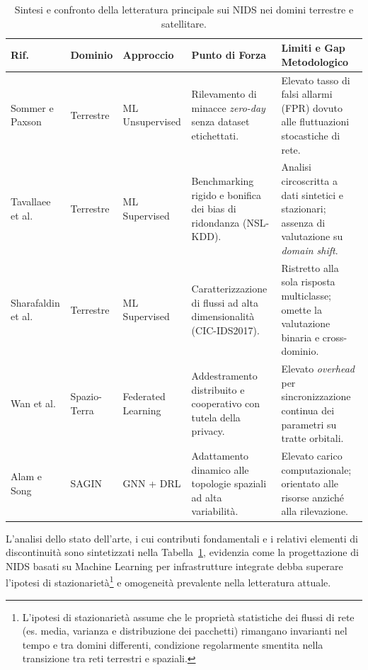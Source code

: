 \begin{table}[H]
\centering
\scriptsize
\renewcommand{\arraystretch}{1.1}
\setlength{\tabcolsep}{3pt}
\caption{Sintesi e confronto della letteratura principale sui NIDS nei domini terrestre e satellitare.}
\label{tab:stato_arte_nids}
\begin{tabularx}{\textwidth}{l l l >{\RaggedRight\arraybackslash}X >{\RaggedRight\arraybackslash}X}
\toprule
\textbf{Rif.} & \textbf{Dominio} & \textbf{Approccio} & \textbf{Punto di Forza} & \textbf{Limiti e Gap Metodologico} \\
\midrule
Sommer e Paxson \cite{sommer2010} & Terrestre & ML Unsupervised & Rilevamento di minacce \textit{zero-day} senza dataset etichettati. & Elevato tasso di falsi allarmi (FPR) dovuto alle fluttuazioni stocastiche di rete. \\ [2pt]
Tavallaee et al. \cite{tavallaee2009} & Terrestre & ML Supervised & Benchmarking rigido e bonifica dei bias di ridondanza (NSL-KDD). & Analisi circoscritta a dati sintetici e stazionari; assenza di valutazione su \textit{domain shift}. \\ [2pt]
Sharafaldin et al. \cite{sharafaldin2018} & Terrestre & ML Supervised & Caratterizzazione di flussi ad alta dimensionalità (CIC-IDS2017). & Ristretto alla sola risposta multiclasse; omette la valutazione binaria e cross-dominio. \\ [2pt]
Wan et al. \cite{wan2025} & Spazio-Terra & Federated Learning & Addestramento distribuito e cooperativo con tutela della privacy. & Elevato \textit{overhead} per sincronizzazione continua dei parametri su tratte orbitali. \\ [2pt]
Alam e Song \cite{alam2024} & SAGIN & GNN + DRL & Adattamento dinamico alle topologie spaziali ad alta variabilità. & Elevato carico computazionale; orientato alle risorse anziché alla rilevazione. \\
\bottomrule
\end{tabularx}
\end{table}

\vspace{0.5em}
\noindent
L'analisi dello stato dell'arte, i cui contributi fondamentali e i relativi elementi di discontinuità sono sintetizzati nella Tabella~\ref{tab:stato_arte_nids}, evidenzia come la progettazione di NIDS basati su Machine Learning per infrastrutture integrate debba superare l'ipotesi di stazionarietà\footnote{L'ipotesi di stazionarietà assume che le proprietà statistiche dei flussi di rete (es. media, varianza e distribuzione dei pacchetti) rimangano invarianti nel tempo e tra domini differenti, condizione regolarmente smentita nella transizione tra reti terrestri e spaziali.} e omogeneità prevalente nella letteratura attuale.

